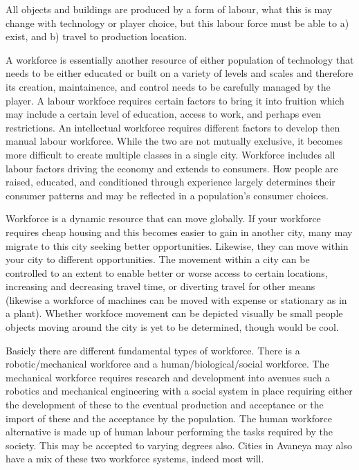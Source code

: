 
All objects and buildings are produced by a form of labour, what this is may change with technology or player choice, but this labour force must be able to a) exist, and b) travel to production location.

A workforce is essentially another resource of either population of technology that needs to be either educated or built on a variety of levels and scales and therefore its creation, maintainence, and control needs to be carefully managed by the player. A labour workfoce requires certain factors to bring it into fruition which may include a certain level of education, access to work, and perhaps even restrictions. An intellectual workforce requires different factors to develop then manual labour workforce. While the two are not mutually exclusive, it becomes more difficult to create multiple classes in a single city. Workforce includes all labour factors driving the economy and extends to consumers. How people are raised, educated, and conditioned through experience largely determines their consumer patterns and may be reflected in a population's consumer choices.

Workforce is a dynamic resource that can move globally. If your workforce requires cheap housing and this becomes easier to gain in another city, many may migrate to this city seeking better opportunities. Likewise, they can move within your city to different opportunities. The movement within a city can be controlled to an extent to enable better or worse access to certain locations, increasing and decreasing travel time, or diverting travel for other means (likewise a workforce of machines can be moved with expense or stationary as in a plant). Whether workfoce movement can be depicted visually be small people objects moving around the city is yet to be determined, though would be cool. 

Basicly there are different fundamental types of workforce. There is a robotic/mechanical workforce and a human/biological/social workforce. The mechanical workforce requires research and development into avenues such a robotics and mechanical engineering with a social system in place requiring either the development of these to the eventual production and acceptance or the import of these and the acceptance by the population. The human workforce alternative is made up of human labour performing the tasks required by the society. This may be accepted to varying degrees also. Cities in Avaneya may also have a mix of these two workforce systems, indeed most will. 

